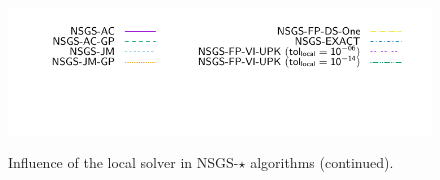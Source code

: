 \begin{figure}
     \\
    {\includegraphics[height=\legendheight]{../figure/NSGS/LocalSolver/1.0e-08/50/time/profile-Chain_legend.pdf}}
    \caption{Influence of the local solver in {\sf NSGS-$\star$} algorithms (continued).}
    \label{fig:NSGS/LocalSolver}
  \end{figure}


